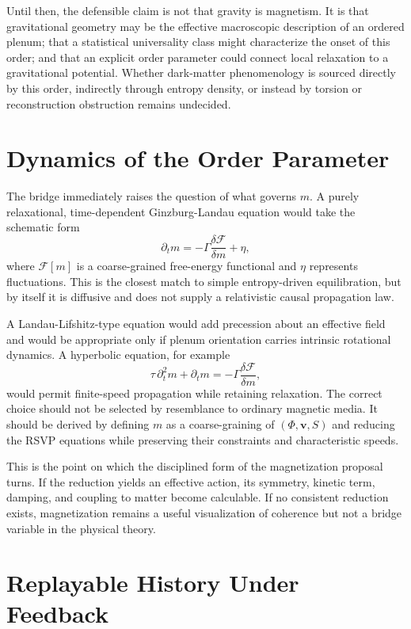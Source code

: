 \documentclass[11pt]{article}
\begin{document}
Until then, the defensible claim is not that gravity is magnetism. It is that gravitational geometry may be the effective macroscopic description of an ordered plenum; that a statistical universality class might characterize the onset of this order; and that an explicit order parameter could connect local relaxation to a gravitational potential. Whether dark-matter phenomenology is sourced directly by this order, indirectly through entropy density, or instead by torsion or reconstruction obstruction remains undecided.

\section{Dynamics of the Order Parameter}
\label{sec:dynamics}

The bridge immediately raises the question of what governs $m$. A purely relaxational, time-dependent Ginzburg-Landau equation would take the schematic form
\[
\partial_t m=-\Gamma\frac{\delta\mathcal{F}}{\delta m}+\eta,
\]
where $\mathcal{F}[m]$ is a coarse-grained free-energy functional and $\eta$ represents fluctuations. This is the closest match to simple entropy-driven equilibration, but by itself it is diffusive and does not supply a relativistic causal propagation law.

A Landau-Lifshitz-type equation would add precession about an effective field and would be appropriate only if plenum orientation carries intrinsic rotational dynamics. A hyperbolic equation, for example
\[
\tau\,\partial_t^2m+\partial_t m
=-\Gamma\frac{\delta\mathcal{F}}{\delta m},
\]
would permit finite-speed propagation while retaining relaxation. The correct choice should not be selected by resemblance to ordinary magnetic media. It should be derived by defining $m$ as a coarse-graining of $(\Phi,\mathbf{v},S)$ and reducing the RSVP equations while preserving their constraints and characteristic speeds.

This is the point on which the disciplined form of the magnetization proposal turns. If the reduction yields an effective action, its symmetry, kinetic term, damping, and coupling to matter become calculable. If no consistent reduction exists, magnetization remains a useful visualization of coherence but not a bridge variable in the physical theory.

\section{Replayable History Under Feedback}
\label{sec:replay}
\end{document}
